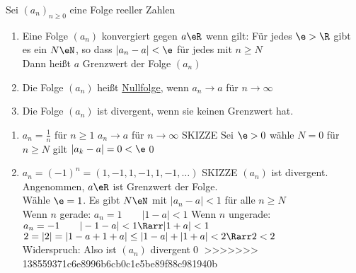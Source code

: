 %
\Def
Sei $(a_n)_{n\geq 0}$ eine Folge reeller Zahlen
\begin{enumerate}
\item{Eine Folge $(a_n)$ konvergiert gegen $a\eR$ wenn gilt: Für jedes $\e>\R$ gibt es ein $N\eN$, so dass $|a_n-a|<\e$ für jedes \nN{} mit $n\geq N$\\
Dann heißt $a$ Grenzwert der Folge $(a_n)$\\
}
\item{Die Folge $(a_n)$ heißt \underline{Nullfolge}, wenn $a_n→a$ für $n→∞$}
\item{Die Folge $(a_n)$ ist divergent, wenn sie keinen Grenzwert hat.}
\end{enumerate}
%
\bsp
\begin{enumerate}
\item{$a_n=\frac{1}{n}$ für $n\geq 1$
 $a_n→a$ für $n→∞$ SKIZZE %
\bew
Sei $\e>0$ wähle $N=0$ für $n\geq N$ gilt $|a_k-a|=0<\e$\qed}
\item{$a_n=(-1)^n=(1,-1,1,-1,1,-1,…)$ SKIZZE %
 $(a_n)$ ist divergent. 
\bew
Angenommen, $a\eR$ ist Grenzwert der Folge.\\
Wähle $\e=1$. Es gibt $N\eN$ mit $|a_n-a|<1$ für alle $n\geq N$\\
Wenn $n$ gerade: $a_n=1\qquad |1-a|<1$
Wenn $n$ ungerade: $a_n=-1\qquad |-1-a|<1 \Rarr |1+a|<1$\\
$2=|2|=|1-a+1+a|\leq |1-a|+|1+a|<2 \Rarr 2<2$\\
Widerspruch: Also ist $(a_n)$ divergent\qed}
>>>>>>> 138559371c6e8996b6cb0c1e5be89f88c981940b
\end{enumerate}